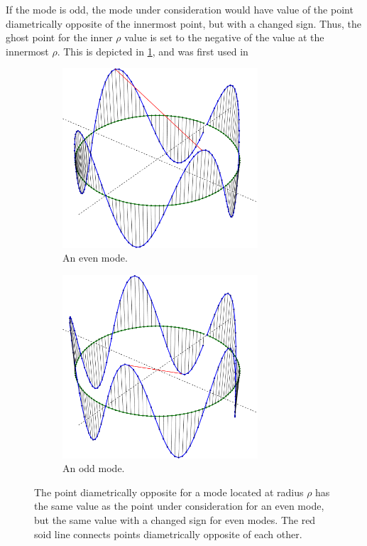 If the mode is odd, the mode under consideration would have value of the point diametrically opposite of the innermost point, but with a changed sign.
Thus, the ghost point for the inner $\rho$ value is set to the negative of the value at the innermost $\rho$.
This is depicted in \cref{fig:BCLaplace}, and was first used in
%
\begin{figure}[h!]
    \centering
    \begin{subfigure}[t]{0.5\textwidth}
        \centering
        \includegraphics[width=0.8\textwidth]{fig/mode_4}
        \caption{An even mode.}
    \end{subfigure}%
    \hfill
    \begin{subfigure}[t]{0.5\textwidth}
        \centering
        \includegraphics[width=0.8\textwidth]{fig/mode_5}
        \caption{An odd mode.}
    \end{subfigure}
        \caption{The point diametrically opposite for a mode located at radius $\rho$ has the same value as the point under consideration for an even mode, but the same value with a changed sign for even modes.
        The red soid line connects points diametrically opposite of each other.}
    \label{fig:BCLaplace}
\end{figure}
